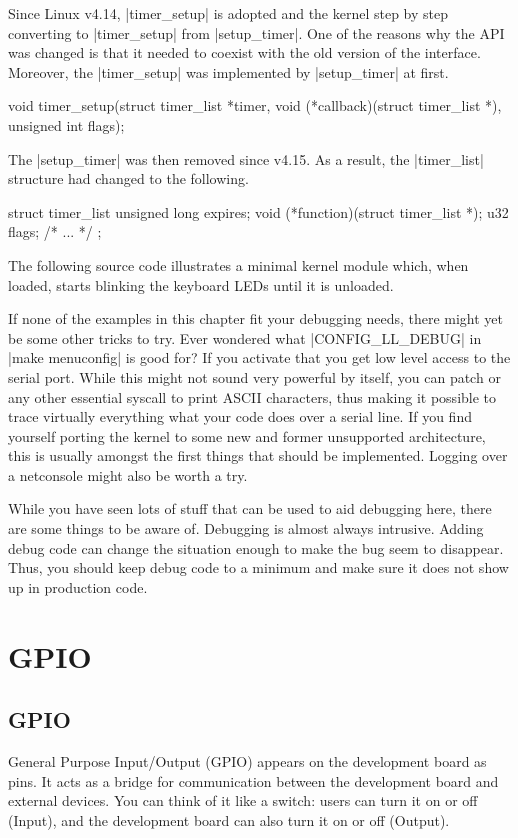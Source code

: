 \documentclass[10pt, oneside]{book}
\begin{document}
Since Linux v4.14, \cpp|timer_setup| is adopted and the kernel step by step converting to \cpp|timer_setup| from \cpp|setup_timer|.
One of the reasons why the API was changed is that it needed to coexist with the old version of the interface.
Moreover, the \cpp|timer_setup| was implemented by \cpp|setup_timer| at first.
\begin{code}
void timer_setup(struct timer_list *timer,
                 void (*callback)(struct timer_list *), unsigned int flags);
\end{code}

The \cpp|setup_timer| was then removed since v4.15.
As a result, the \cpp|timer_list| structure had changed to the following.
\begin{code}
struct timer_list {
    unsigned long expires;
    void (*function)(struct timer_list *);
    u32 flags;
    /* ... */
};
\end{code}

The following source code illustrates a minimal kernel module which, when loaded, starts blinking the keyboard LEDs until it is unloaded.


If none of the examples in this chapter fit your debugging needs, there might yet be some other tricks to try.
Ever wondered what \cpp|CONFIG_LL_DEBUG| in \sh|make menuconfig| is good for?
If you activate that you get low level access to the serial port.
While this might not sound very powerful by itself, you can patch  or any other essential syscall to print ASCII characters, thus making it possible to trace virtually everything what your code does over a serial line.
If you find yourself porting the kernel to some new and former unsupported architecture, this is usually amongst the first things that should be implemented.
Logging over a netconsole might also be worth a try.

While you have seen lots of stuff that can be used to aid debugging here, there are some things to be aware of. Debugging is almost always intrusive.
Adding debug code can change the situation enough to make the bug seem to disappear.
Thus, you should keep debug code to a minimum and make sure it does not show up in production code.

\section{GPIO}
\label{sec:gpio}
\subsection{GPIO}
\label{sec:gpio_introduction}
General Purpose Input/Output (GPIO) appears on the development board as pins.
It acts as a bridge for communication between the development board and external devices.
You can think of it like a switch: users can turn it on or off (Input), and the development board can also turn it on or off (Output).
\end{document}

